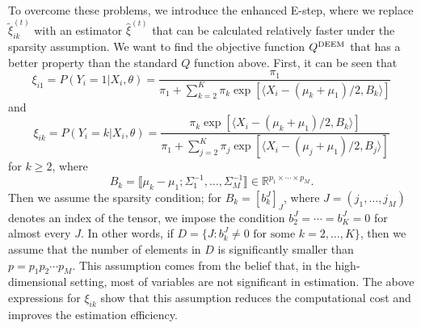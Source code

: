 \documentclass[11pt]{article}
\newcommand{\rp}{\mathbb{R}^{p_1\times \cdots \times p_M}}
\newcommand{\br}[1]{\llbracket #1 \rrbracket}
\newcommand{\wh}{\widehat}
\newcommand{\wt}{\widetilde}
\begin{document}
To overcome these problems, we introduce the enhanced E-step, where we replace $\wt\xi^{(t)}_{ik}$ with an estimator $\wh\xi^{(t)}$ that can be calculated relatively faster under the sparsity assumption. 
We want to find the objective function $Q^{\textup{DEEM}}$ that has a better property than the standard $Q$ function above. First, it can be seen that
\begin{equation*}
  \xi_{i1}=P(Y_i=1|X_i, \theta) = \frac{\pi_1}{\pi_1 + \sum_{k=2}^K \pi_k \exp\left[ \langle X_i - (\mu_k+\mu_1)/2 , B_k \rangle \right]}
\end{equation*}
and
\begin{equation*}
  \xi_{ik}=P(Y_i=k|X_i, \theta) = \frac{\pi_k \exp \left[ \langle X_i - (\mu_k+\mu_1)/2 , B_k \rangle \right]}{\pi_1 + \sum_{j=2}^K \pi_j \exp\left[ \langle X_i - (\mu_j+\mu_1)/2 , B_j \rangle \right]}
\end{equation*}
for $k\ge2$, where
\begin{equation*}
  B_k = \br{\mu_k - \mu_1 ; \Sigma_1^{-1} , \dots , \Sigma_M^{-1}}\in  \rp.
\end{equation*}
Then we assume the sparsity condition; for $B_k=[b^J_k]_{J}$, where $J=(j_1,\dots, j_M)$ denotes an index of the tensor, we impose the condition $b_2^J=\cdots = b_K^J=0 $ for almost every $J$. In other words, if 
$D= \{J : b_k^J \neq 0 \text{ for some $k=2,\dots, K$} \}$, then we assume that the number of elements in $D$ is significantly smaller than $p=p_1p_2 \cdots p_M$. This assumption comes from the belief that, in the high-dimensional setting, most of variables are not significant in estimation.
The above expressions for $\xi_{ik}$ show that this assumption reduces the computational cost and improves the  estimation efficiency.
\end{document}
